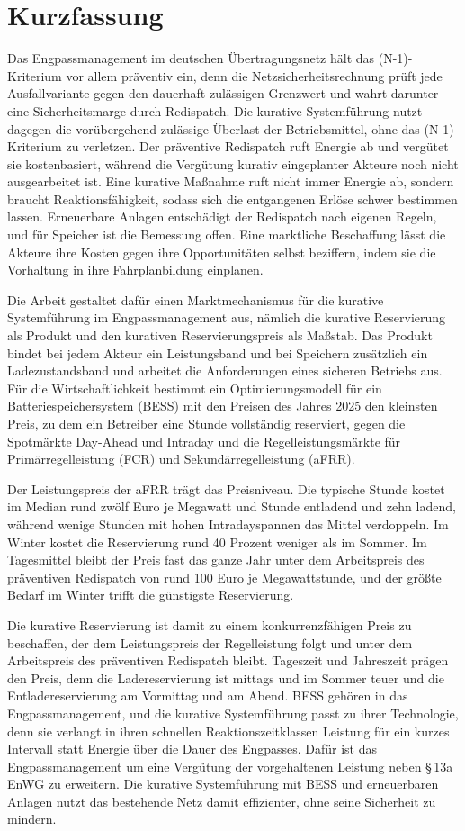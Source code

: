 {\chapter*{Kurzfassung}
Das Engpassmanagement im deutschen Übertragungsnetz hält das \mbox{(N-1)-Kriterium} vor allem präventiv ein, denn die Netzsicherheitsrechnung prüft jede Ausfallvariante gegen den dauerhaft zulässigen Grenzwert und wahrt darunter eine Sicherheitsmarge durch Redispatch.
Die kurative Systemführung nutzt dagegen die vorübergehend zulässige Überlast der Betriebsmittel, ohne das \mbox{(N-1)-Kriterium} zu verletzen.
Der präventive Redispatch ruft Energie ab und vergütet sie kostenbasiert, während die Vergütung kurativ eingeplanter Akteure noch nicht ausgearbeitet ist.
Eine kurative Maßnahme ruft nicht immer Energie ab, sondern braucht Reaktionsfähigkeit, sodass sich die entgangenen Erlöse schwer bestimmen lassen.
Erneuerbare Anlagen entschädigt der Redispatch nach eigenen Regeln, und für Speicher ist die Bemessung offen.
Eine marktliche Beschaffung lässt die Akteure ihre Kosten gegen ihre Opportunitäten selbst beziffern, indem sie die Vorhaltung in ihre Fahrplanbildung einplanen.

Die Arbeit gestaltet dafür einen Marktmechanismus für die kurative Systemführung im Engpassmanagement aus, nämlich die kurative Reservierung als Produkt und den kurativen Reservierungspreis als Maßstab.
Das Produkt bindet bei jedem Akteur ein Leistungsband und bei Speichern zusätzlich ein Ladezustandsband und arbeitet die Anforderungen eines sicheren Betriebs aus.
Für die Wirtschaftlichkeit bestimmt ein Optimierungsmodell für ein Batteriespeichersystem (\acs{BESS}) mit den Preisen des Jahres 2025 den kleinsten Preis, zu dem ein Betreiber eine Stunde vollständig reserviert, gegen die Spotmärkte Day-Ahead und Intraday und die Regelleistungsmärkte für Primärregelleistung (\acs{FCR}) und Sekundärregelleistung (\acs{aFRR}).

Der Leistungspreis der \acs{aFRR} trägt das Preisniveau.
Die typische Stunde kostet im Median rund zwölf Euro je Megawatt und Stunde entladend und zehn ladend, während wenige Stunden mit hohen Intradayspannen das Mittel verdoppeln.
Im Winter kostet die Reservierung rund 40 Prozent weniger als im Sommer.
Im Tagesmittel bleibt der Preis fast das ganze Jahr unter dem Arbeitspreis des präventiven Redispatch von rund 100 Euro je Megawattstunde, und der größte Bedarf im Winter trifft die günstigste Reservierung.

Die kurative Reservierung ist damit zu einem konkurrenzfähigen Preis zu beschaffen, der dem Leistungspreis der Regelleistung folgt und unter dem Arbeitspreis des präventiven Redispatch bleibt.
Tageszeit und Jahreszeit prägen den Preis, denn die Ladereservierung ist mittags und im Sommer teuer und die Entladereservierung am Vormittag und am Abend.
\acs{BESS} gehören in das Engpassmanagement, und die kurative Systemführung passt zu ihrer Technologie, denn sie verlangt in ihren schnellen Reaktionszeitklassen Leistung für ein kurzes Intervall statt Energie über die Dauer des Engpasses.
Dafür ist das Engpassmanagement um eine Vergütung der vorgehaltenen Leistung neben §\,13a \ac{EnWG} zu erweitern.
Die kurative Systemführung mit \acs{BESS} und erneuerbaren Anlagen nutzt das bestehende Netz damit effizienter, ohne seine Sicherheit zu mindern.
}
	{\varAbstractGerman
	\varAbstractEnglish}
	{\varAbstractEnglish}

\cleardoublepage
